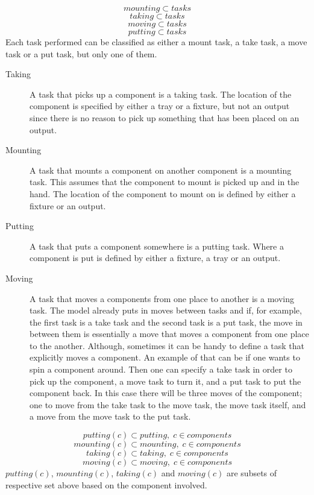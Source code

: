 \documentclass[10pt,a4paper]{report}
\begin{document}
\begin{equation}\label{eq:26}
mounting \subset tasks
\end{equation}
\begin{equation}\label{eq:27}
taking \subset tasks
\end{equation}
\begin{equation}\label{eq:28}
moving \subset tasks
\end{equation}
\begin{equation}\label{eq:29}
putting \subset tasks
\end{equation}
Each task performed can be classified as either a mount task, a take task, a move task or a put task, but only one of them.
\begin{description}
\item[Taking] A task that picks up a component is a taking task. The location of the component is specified by either a tray or a fixture, but not an output since there is no reason to pick up something that has been placed on an output.

\item[Mounting] A task that mounts a component on another component is a mounting task. This assumes that the component to mount is picked up and in the hand. The location of the component to mount on is defined by either a fixture or an output.

\item[Putting] A task that puts a component somewhere is a putting task. Where a component is put is defined by either a fixture, a tray or an output.

\item[Moving] A task that moves a components from one place to another is a moving task. The model already puts in moves between tasks and if, for example, the first task is a take task and the second task is a put task, the move in between them is essentially a move that moves a component from one place to the another. Although, sometimes it can be handy to define a task that explicitly moves a component. An example of that can be if one wants to spin a component around. Then one can specify a take task in order to pick up the component, a move task to turn it, and a put task to put the component back. In this case there will be three moves of the component; one to move from the take task to the move task, the move task itself, and a move from the move task to the put task.
\end{description}
\begin{equation}\label{eq:35}
putting(c) \subset putting, \; c \in components
\end{equation}
\begin{equation}\label{eq:36}
mounting(c) \subset mounting, \; c \in components
\end{equation}
\begin{equation}\label{eq:37}
taking(c) \subset taking, \; c \in components
\end{equation}
\begin{equation}\label{eq:38}
moving(c) \subset moving, \; c \in components
\end{equation}
$putting(c)$, $mounting(c)$, $taking(c)$ and $moving(c)$ are subsets of respective set above based on the component involved.
\end{document}
